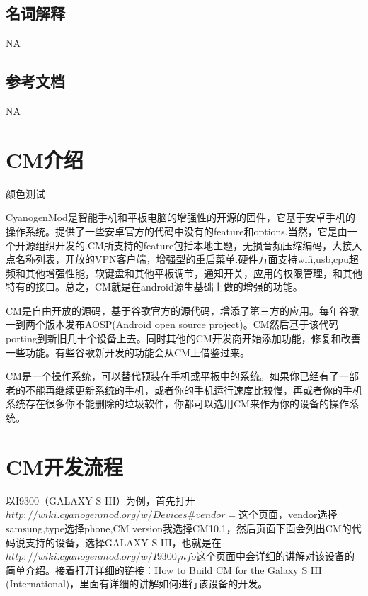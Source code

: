 \documentclass[12pt,a4paper]{article}
\begin{document}
\subsection{名词解释}
NA
\label{1_4}

\subsection{参考文档}
NA
\label{1_5}
\label{1}



\section{CM介绍}
\textcolor[rgb]{1.00,0,0}{颜色测试}

  CyanogenMod是智能手机和平板电脑的增强性的开源的固件，它基于安卓手机的操作系统。提供了一些安卓官方的代码中没有的feature和options.当然，它是由一个开源组织开发的.CM所支持的feature包括本地主题，无损音频压缩编码，大接入点名称列表，开放的VPN客户端，增强型的重启菜单.硬件方面支持wifi,usb,cpu超频和其他增强性能，软键盘和其他平板调节，通知开关，应用的权限管理，和其他特有的接口。总之，CM就是在android源生基础上做的增强的功能。

  CM是自由开放的源码，基于谷歌官方的源代码，增添了第三方的应用。每年谷歌一到两个版本发布AOSP(Android open source project)。CM然后基于该代码porting到新旧几十个设备上去。同时其他的CM开发商开始添加功能，修复和改善一些功能。有些谷歌新开发的功能会从CM上借鉴过来。

  CM是一个操作系统，可以替代预装在手机或平板中的系统。如果你已经有了一部老的不能再继续更新系统的手机，或者你的手机运行速度比较慢，再或者你的手机系统存在很多你不能删除的垃圾软件，你都可以选用CM来作为你的设备的操作系统。
\label{2}


\section{CM开发流程}
  以I9300（GALAXY S III）为例，首先打开$http://wiki.cyanogenmod.org/w/Devices\#vendor=$这个页面，vendor选择samsung,type选择phone,CM version我选择CM10.1，然后页面下面会列出CM的代码说支持的设备，选择GALAXY S III，也就是在$http://wiki.cyanogenmod.org/w/I9300_Info$这个页面中会详细的讲解对该设备的简单介绍。接着打开详细的链接：How to Build CM for the Galaxy S III (International)，里面有详细的讲解如何进行该设备的开发。
\end{document}
